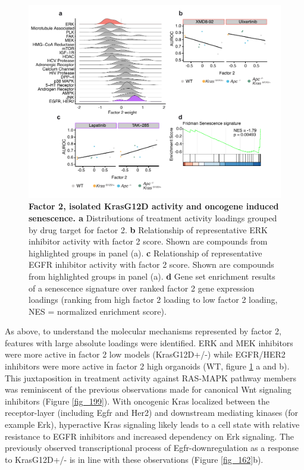 \begin{flushleft}
\begin{figure}[h!]
\centering
\includegraphics[scale=0.75,
                keepaspectratio]{figures/adenomaprofiling/pdf/fig_3_1_2.pdf}
\caption[Factor 2, isolated KrasG12D activity and oncogene induced senescence]{\textbf{Factor 2, isolated KrasG12D activity and oncogene induced senescence. a} Distributions of treatment activity loadings grouped by drug target for factor 2. \textbf{b} Relationship of representative ERK inhibitor activity with factor 2 score. Shown are compounds from highlighted groups in panel (a). \textbf{c} Relationship of representative EGFR inhibitor activity with factor 2 score. Shown are compounds from highlighted groups in panel (a). \textbf{d} Gene set enrichment results of a senescence signature \citep{Fridman2008-ky} over ranked factor 2 gene expression loadings (ranking from high factor 2 loading to low factor 2 loading, NES = normalized enrichment score).}
\label{fig_200}
\end{figure}

As above, to understand the molecular mechanisms represented by factor 2, features with large absolute loadings were identified. ERK and MEK inhibitors were more active in factor 2 low models (KrasG12D+/-) while EGFR/HER2 inhibitors were more active in factor 2 high organoids (WT, figure \ref{fig_200} a and b). This juxtaposition in treatment activity against RAS-MAPK pathway members was reminiscent of the previous observations made for canonical Wnt signaling inhibitors (Figure \ref{fig_199}). With oncogenic Kras localized between the receptor-layer (including Egfr and Her2) and downstream mediating kinases (for example Erk), hyperactive Kras signaling likely leads to a cell state with relative resistance to EGFR inhibitors and increased dependency on Erk signaling. The previously observed transcriptional process of Egfr-downregulation as a response to KrasG12D+/- is in line with these observations (Figure \ref{fig_162}b). 


\end{flushleft}
